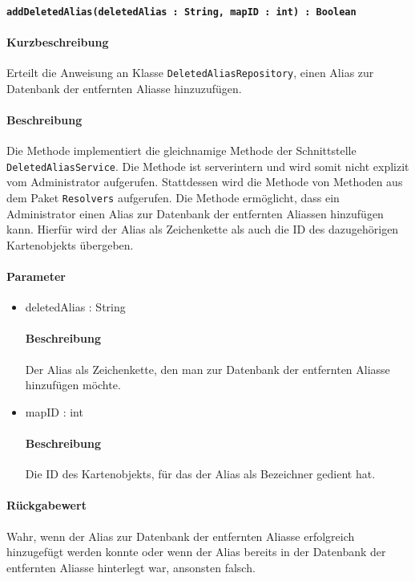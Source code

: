 \paragraph*{\texttt{addDeletedAlias(deletedAlias : String, mapID : int) : Boolean}}%
\paragraph*{Kurzbeschreibung}
Erteilt die Anweisung an Klasse \texttt{DeletedAliasRepository}, einen Alias zur Datenbank der entfernten Aliasse hinzuzufügen.
\paragraph*{Beschreibung}
Die Methode implementiert die gleichnamige Methode der Schnittstelle \texttt{DeletedAliasService}.
Die Methode ist serverintern und wird somit nicht explizit vom Administrator aufgerufen.
Stattdessen wird die Methode von Methoden aus dem Paket \texttt{Resolvers} aufgerufen.
Die Methode ermöglicht, dass ein Administrator einen Alias zur Datenbank der entfernten Aliassen hinzufügen kann.
Hierfür wird der Alias als Zeichenkette als auch die ID des dazugehörigen Kartenobjekts übergeben.
\paragraph*{Parameter}
\begin{itemize}
    \item deletedAlias : String
    		\paragraph*{Beschreibung}
    		Der Alias als Zeichenkette, den man zur Datenbank der entfernten Aliasse hinzufügen möchte.
    \item mapID : int
    		\paragraph*{Beschreibung}
    		Die ID des Kartenobjekts, für das der Alias als Bezeichner gedient hat.
\end{itemize}
\paragraph*{Rückgabewert}
Wahr, wenn der Alias zur Datenbank der entfernten Aliasse erfolgreich hinzugefügt werden konnte oder wenn der Alias bereits in der Datenbank der entfernten Aliasse hinterlegt war, ansonsten falsch.

